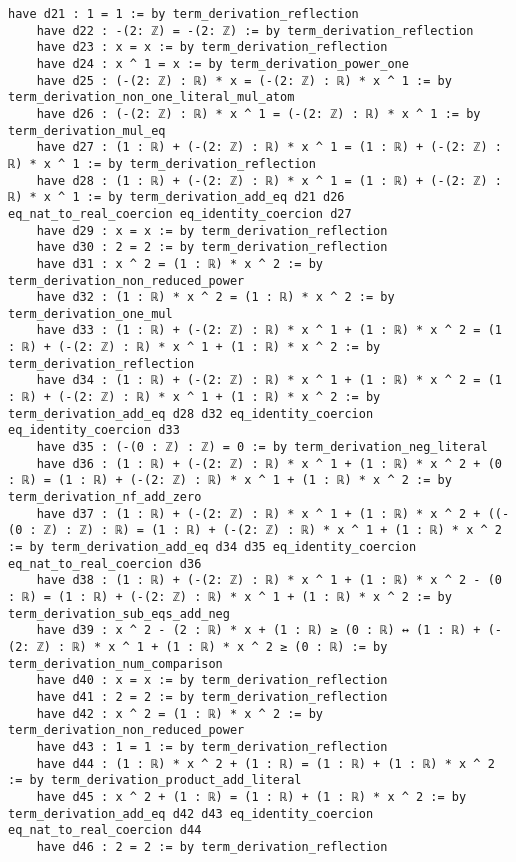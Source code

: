 \documentclass{article}
\begin{document}
\begin{tcolorbox}[colback=white!10, width=\linewidth]
\begin{lstlisting}[language=Lean4]
    have d21 : 1 = 1 := by term_derivation_reflection
    have d22 : -(2: ℤ) = -(2: ℤ) := by term_derivation_reflection
    have d23 : x = x := by term_derivation_reflection
    have d24 : x ^ 1 = x := by term_derivation_power_one
    have d25 : (-(2: ℤ) : ℝ) * x = (-(2: ℤ) : ℝ) * x ^ 1 := by term_derivation_non_one_literal_mul_atom
    have d26 : (-(2: ℤ) : ℝ) * x ^ 1 = (-(2: ℤ) : ℝ) * x ^ 1 := by term_derivation_mul_eq
    have d27 : (1 : ℝ) + (-(2: ℤ) : ℝ) * x ^ 1 = (1 : ℝ) + (-(2: ℤ) : ℝ) * x ^ 1 := by term_derivation_reflection
    have d28 : (1 : ℝ) + (-(2: ℤ) : ℝ) * x ^ 1 = (1 : ℝ) + (-(2: ℤ) : ℝ) * x ^ 1 := by term_derivation_add_eq d21 d26 eq_nat_to_real_coercion eq_identity_coercion d27
    have d29 : x = x := by term_derivation_reflection
    have d30 : 2 = 2 := by term_derivation_reflection
    have d31 : x ^ 2 = (1 : ℝ) * x ^ 2 := by term_derivation_non_reduced_power
    have d32 : (1 : ℝ) * x ^ 2 = (1 : ℝ) * x ^ 2 := by term_derivation_one_mul
    have d33 : (1 : ℝ) + (-(2: ℤ) : ℝ) * x ^ 1 + (1 : ℝ) * x ^ 2 = (1 : ℝ) + (-(2: ℤ) : ℝ) * x ^ 1 + (1 : ℝ) * x ^ 2 := by term_derivation_reflection
    have d34 : (1 : ℝ) + (-(2: ℤ) : ℝ) * x ^ 1 + (1 : ℝ) * x ^ 2 = (1 : ℝ) + (-(2: ℤ) : ℝ) * x ^ 1 + (1 : ℝ) * x ^ 2 := by term_derivation_add_eq d28 d32 eq_identity_coercion eq_identity_coercion d33
    have d35 : (-(0 : ℤ) : ℤ) = 0 := by term_derivation_neg_literal
    have d36 : (1 : ℝ) + (-(2: ℤ) : ℝ) * x ^ 1 + (1 : ℝ) * x ^ 2 + (0 : ℝ) = (1 : ℝ) + (-(2: ℤ) : ℝ) * x ^ 1 + (1 : ℝ) * x ^ 2 := by term_derivation_nf_add_zero
    have d37 : (1 : ℝ) + (-(2: ℤ) : ℝ) * x ^ 1 + (1 : ℝ) * x ^ 2 + ((-(0 : ℤ) : ℤ) : ℝ) = (1 : ℝ) + (-(2: ℤ) : ℝ) * x ^ 1 + (1 : ℝ) * x ^ 2 := by term_derivation_add_eq d34 d35 eq_identity_coercion eq_nat_to_real_coercion d36
    have d38 : (1 : ℝ) + (-(2: ℤ) : ℝ) * x ^ 1 + (1 : ℝ) * x ^ 2 - (0 : ℝ) = (1 : ℝ) + (-(2: ℤ) : ℝ) * x ^ 1 + (1 : ℝ) * x ^ 2 := by term_derivation_sub_eqs_add_neg
    have d39 : x ^ 2 - (2 : ℝ) * x + (1 : ℝ) ≥ (0 : ℝ) ↔ (1 : ℝ) + (-(2: ℤ) : ℝ) * x ^ 1 + (1 : ℝ) * x ^ 2 ≥ (0 : ℝ) := by term_derivation_num_comparison
    have d40 : x = x := by term_derivation_reflection
    have d41 : 2 = 2 := by term_derivation_reflection
    have d42 : x ^ 2 = (1 : ℝ) * x ^ 2 := by term_derivation_non_reduced_power
    have d43 : 1 = 1 := by term_derivation_reflection
    have d44 : (1 : ℝ) * x ^ 2 + (1 : ℝ) = (1 : ℝ) + (1 : ℝ) * x ^ 2 := by term_derivation_product_add_literal
    have d45 : x ^ 2 + (1 : ℝ) = (1 : ℝ) + (1 : ℝ) * x ^ 2 := by term_derivation_add_eq d42 d43 eq_identity_coercion eq_nat_to_real_coercion d44
    have d46 : 2 = 2 := by term_derivation_reflection

\end{lstlisting}
\end{tcolorbox}
\end{document}
